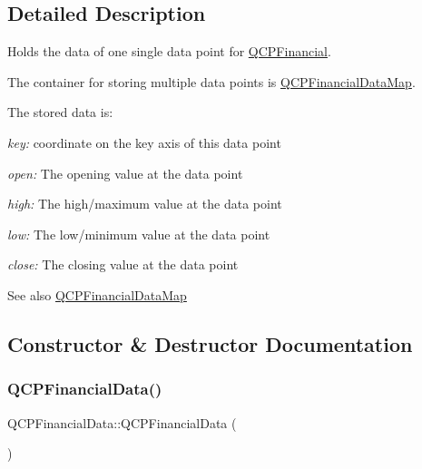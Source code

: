 \subsection{Detailed Description}
Holds the data of one single data point for \hyperlink{class_q_c_p_financial}{Q\+C\+P\+Financial}. 

The container for storing multiple data points is \hyperlink{qcustomplot_8h_a745c09823fae0974b50beca9bc3b3d7d}{Q\+C\+P\+Financial\+Data\+Map}.

The stored data is\+: \begin{DoxyItemize}
\item {\itshape key\+:} coordinate on the key axis of this data point \item {\itshape open\+:} The opening value at the data point \item {\itshape high\+:} The high/maximum value at the data point \item {\itshape low\+:} The low/minimum value at the data point \item {\itshape close\+:} The closing value at the data point\end{DoxyItemize}
\begin{DoxySeeAlso}{See also}
\hyperlink{qcustomplot_8h_a745c09823fae0974b50beca9bc3b3d7d}{Q\+C\+P\+Financial\+Data\+Map} 
\end{DoxySeeAlso}


\subsection{Constructor \& Destructor Documentation}
\hypertarget{class_q_c_p_financial_data_a1ca53b3a9ae4e9658a4fd1ca57d76ba4}{}\label{class_q_c_p_financial_data_a1ca53b3a9ae4e9658a4fd1ca57d76ba4} 
\subsubsection{\texorpdfstring{Q\+C\+P\+Financial\+Data()}{QCPFinancialData()}\hspace{0.1cm}{\footnotesize\ttfamily [1/2]}}
{\footnotesize\ttfamily Q\+C\+P\+Financial\+Data\+::\+Q\+C\+P\+Financial\+Data (\begin{DoxyParamCaption}{ }\end{DoxyParamCaption})}

